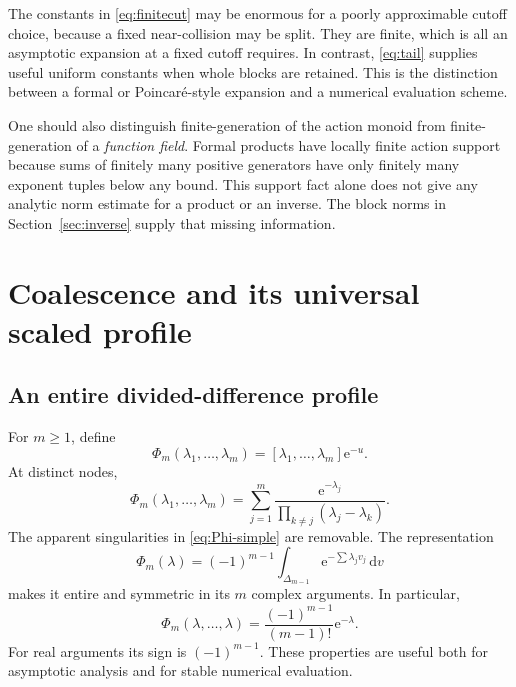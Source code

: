 \documentclass[11pt,a4paper]{article}
\numberwithin{equation}{section}
\theoremstyle{definition}
\theoremstyle{remark}
\newcommand{\e}{\mathrm e}
\newcommand{\dd}{\,\mathrm d}
\begin{document}
The constants in \eqref{eq:finitecut} may be enormous for a poorly
approximable cutoff choice, because a fixed near-collision may be split.
They are finite, which is all an asymptotic expansion at a fixed cutoff
requires. In contrast, \eqref{eq:tail} supplies useful uniform constants
when whole blocks are retained. This is the distinction between a formal
or Poincar\'e-style expansion and a numerical evaluation scheme.

One should also distinguish finite-generation of the action monoid from
finite-generation of a \emph{function field}. Formal products have locally
finite action support because sums of finitely many positive generators
have only finitely many exponent tuples below any bound. This support
fact alone does not give any analytic norm estimate for a product or an
inverse. The block norms in Section~\ref{sec:inverse} supply that missing
information.

\section{Coalescence and its universal scaled profile}
\label{sec:coalescence}

\subsection{An entire divided-difference profile}
For $m\ge1$, define
\begin{equation}
 \Phi_m(\lambda_1,\ldots,\lambda_m)
 =[\lambda_1,\ldots,\lambda_m]\e^{-u}.
 \label{eq:Phi}
\end{equation}
At distinct nodes,
\begin{equation}
 \Phi_m(\lambda_1,\ldots,\lambda_m)
 =\sum_{j=1}^m\frac{\e^{-\lambda_j}}
                 {\prod_{k\ne j}(\lambda_j-\lambda_k)}.
 \label{eq:Phi-simple}
\end{equation}
The apparent singularities in \eqref{eq:Phi-simple} are removable. The
representation
\begin{equation}
 \Phi_m(\lambda)=(-1)^{m-1}
       \int_{\Delta_{m-1}}\e^{-\sum\lambda_jv_j}\dd v
 \label{eq:Phi-integral}
\end{equation}
makes it entire and symmetric in its $m$ complex arguments. In particular,
\begin{equation}
 \Phi_m(\lambda,\ldots,\lambda)
   =\frac{(-1)^{m-1}}{(m-1)!}\e^{-\lambda}.
 \label{eq:Phi-confluent}
\end{equation}
For real arguments its sign is $(-1)^{m-1}$. These properties are useful
both for asymptotic analysis and for stable numerical evaluation.
\end{document}
